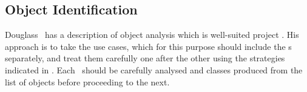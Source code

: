 


%
%
\subsection{Object Identification}\label{sec:objdisc}
Douglass~\cite[\S\,5]{douglass} has a description of object analysis which is well-suited
project \nep. His approach is to take the use cases, which for this purpose should
include the \papp s separately, and treat them carefully one after the other using
the strategies indicated in .
Each \papp\ should be carefully analysed and classes produced from the list of objects
before proceeding to the next.


%
